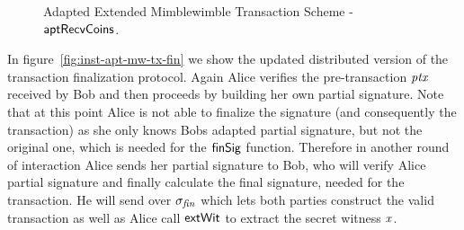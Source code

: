 \begin{figure}
    \begin{center}
    \end{center}
    \caption{Adapted Extended Mimblewimble Transaction Scheme - $\mathsf{aptRecvCoins}$. \label{fig:inst-apt-mw-tx-recv}}
\end{figure}

In figure~\ref{fig:inst-apt-mw-tx-fin} we show the updated distributed version of the transaction finalization protocol. Again Alice verifies the pre-transaction $\mathit{ptx}$ received by Bob and then proceeds by building
her own partial signature. Note that at this point Alice is not able to finalize the signature (and consequently the transaction) as she only knows Bobs adapted partial signature, but not the original one, which is needed
for the $\mathsf{finSig}$ function. Therefore in another round of interaction Alice sends her partial signature to Bob, who will verify Alice partial signature and finally calculate the final signature, needed for the transaction.
He will send over $\sigma_{\mathit{fin}}$ which lets both parties construct the valid transaction as well as Alice call $\mathsf{extWit}$ to extract the secret witness $\mathit{x}$.

